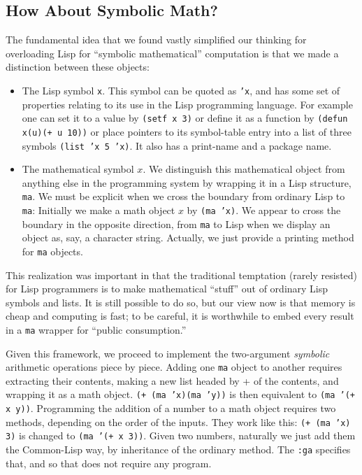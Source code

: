 \documentclass{article}
\begin{document}
{{\subsection{How About Symbolic Math?}
The fundamental idea that we found vastly simplified our thinking for
overloading Lisp for ``symbolic mathematical'' computation is that we
made a distinction between these objects:
\begin{itemize}
\item The Lisp symbol
{\tt x}. This symbol can be quoted as  {\tt 'x}, and has some set
of properties relating to its use in the Lisp programming language.
For example one can set it to a value by {\tt (setf x 3)}
or define it as a function by  {\tt(defun x(u)(+ u 10))} or place pointers
to its symbol-table entry into a list of three symbols {\tt (list 'x 5 'x)}.
It also has a print-name and a package name.
\item
The mathematical symbol $x$.
We distinguish this mathematical object from anything else in
the programming system by wrapping it in a Lisp structure,  {\tt ma}.
We must be explicit when we cross the boundary from ordinary Lisp to {\tt ma}:
Initially we make a math object $x$ by {\tt (ma 'x)}. We appear to cross
the boundary in the opposite direction,
from {\tt ma} to Lisp when we display an object as, say, a character string.
Actually, we just provide a printing method for {\tt ma} objects.
\end{itemize}
This realization was important in that the traditional temptation (rarely resisted) for
Lisp programmers is to make mathematical ``stuff'' out of ordinary Lisp symbols and lists.
It is still possible to do so,
but our view now is that memory is cheap and computing is fast; to be
careful, it is worthwhile to embed every result
in a {\tt ma} wrapper for ``public consumption.'' 

{Given this framework, we proceed to
implement the two-argument {\em symbolic} arithmetic operations piece by piece. 
Adding one {\tt ma} object to another requires extracting their
contents, making a new list headed by + of the contents, and wrapping
it as a math object. {\tt (+ (ma 'x)(ma 'y))} is then equivalent to {\tt (ma '(+ x y))}. 
Programming the addition of a number to a math object requires two methods, 
depending on the order of the inputs. They work like this:
{\tt (+ (ma 'x) 3)} is changed to {\tt (ma '(+ x 3))}. 
Given two numbers, naturally we just add them the
Common-Lisp way, by inheritance of the ordinary method. The {\tt :ga}
specifies that, and so that does not require any program. 



}}}
\end{document}
